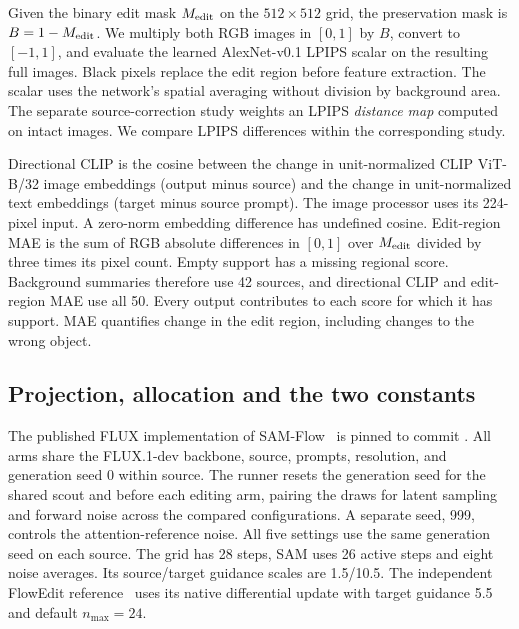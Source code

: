 Given the binary edit mask $M_{\rm edit}$ on the $512\times512$ grid, the preservation mask is $B=1-M_{\rm edit}$. We multiply both RGB images in $[0,1]$ by $B$, convert to $[-1,1]$, and evaluate the learned AlexNet-v0.1 LPIPS scalar on the resulting full images. Black pixels replace the edit region before feature extraction. The scalar uses the network's spatial averaging without division by background area. The separate source-correction study weights an LPIPS \emph{distance map} computed on intact images. We compare LPIPS differences within the corresponding study.

Directional CLIP is the cosine between the change in unit-normalized CLIP ViT-B/32 image embeddings (output minus source) and the change in unit-normalized text embeddings (target minus source prompt). The image processor uses its 224-pixel input. A zero-norm embedding difference has undefined cosine. Edit-region MAE is the sum of RGB absolute differences in $[0,1]$ over $M_{\rm edit}$ divided by three times its pixel count. Empty support has a missing regional score. Background summaries therefore use 42 sources, and directional CLIP and edit-region MAE use all 50. Every output contributes to each score for which it has support. MAE quantifies change in the edit region, including changes to the wrong object.

\subsection{Projection, allocation and the two constants}
The published FLUX implementation of SAM-Flow~\cite{cui2026sam} is pinned to commit . All arms share the FLUX.1-dev backbone, source, prompts, resolution, and generation seed 0 within source. The runner resets the generation seed for the shared scout and before each editing arm, pairing the draws for latent sampling and forward noise across the compared configurations. A separate seed, 999, controls the attention-reference noise. All five settings use the same generation seed on each source. The grid has 28 steps, SAM uses 26 active steps and eight noise averages. Its source/target guidance scales are 1.5/10.5. The independent FlowEdit reference~\cite{kulikov2025flowedit} uses its native differential update with target guidance 5.5 and default $n_{\max}=24$.


